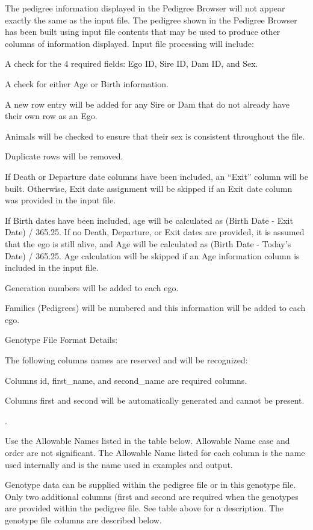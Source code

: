 \documentclass[]{article}
\begin{document}
The pedigree information displayed in the Pedigree Browser will not
appear exactly the same as the input file. The pedigree shown in the
Pedigree Browser has been built using input file contents that may be
used to produce other columns of information displayed. Input file
processing will include:

A check for the 4 required fields: Ego ID, Sire ID, Dam ID, and Sex.

A check for either Age or Birth information.

A new row entry will be added for any Sire or Dam that do not already
have their own row as an Ego.

Animals will be checked to ensure that their sex is consistent
throughout the file.

Duplicate rows will be removed.

If Death or Departure date columns have been included, an ``Exit''
column will be built. Otherwise, Exit date assignment will be skipped if
an Exit date column was provided in the input file.

If Birth dates have been included, age will be calculated as (Birth Date
- Exit Date) / 365.25. If no Death, Departure, or Exit dates are
provided, it is assumed that the ego is still alive, and Age will be
calculated as (Birth Date - Today's Date) / 365.25. Age calculation will
be skipped if an Age information column is included in the input file.

Generation numbers will be added to each ego.

Families (Pedigrees) will be numbered and this information will be added
to each ego.

Genotype File Format Details:

The following columns names are reserved and will be recognized:

Columns id, first\_name, and second\_name are required columns.

Columns first and second will be automatically generated and cannot be
present.

.

Use the Allowable Names listed in the table below. Allowable Name case
and order are not significant. The Allowable Name listed for each column
is the name used internally and is the name used in examples and output.

Genotype data can be supplied within the pedigree file or in this
genotype file. Only two additional columns (first and second are
required when the genotypes are provided within the pedigree file. See
table above for a description. The genotype file columns are described
below.
\end{document}
